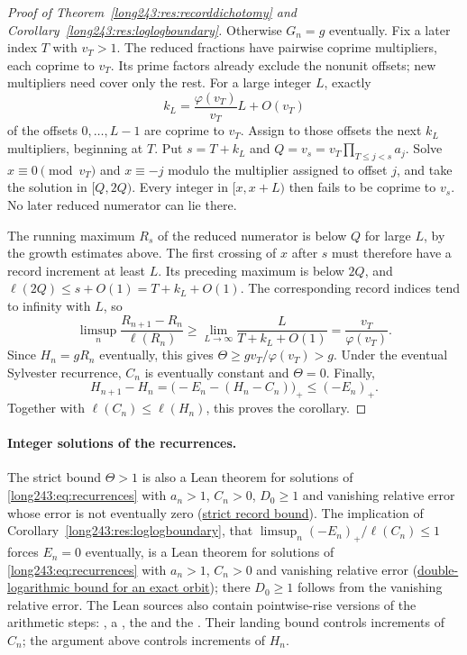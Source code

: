 \begin{proof}[Proof of Theorem~\ref{long243:res:recorddichotomy} and
Corollary~\ref{long243:res:loglogboundary}]
Otherwise $G_n=g$ eventually. Fix a later index $T$ with $v_T>1$.
The reduced fractions have pairwise coprime multipliers, each coprime
to $v_T$. Its prime factors already exclude the nonunit offsets;
new multipliers need cover only the rest. For a large integer $L$, exactly
\[
 k_L=\frac{\varphi(v_T)}{v_T}L+O(v_T)
\]
of the offsets $0,\ldots,L-1$ are coprime to $v_T$.
Assign to those offsets the next $k_L$ multipliers, beginning at $T$.
Put $s=T+k_L$ and $Q=v_s=v_T\prod_{T\le j<s}a_j$.
Solve $x\equiv0\pmod{v_T}$ and $x\equiv-j$ modulo the multiplier
assigned to offset $j$, and take the solution in $[Q,2Q)$.
Every integer in $[x,x+L)$ then fails to be coprime to $v_s$.
No later reduced numerator can lie there.

The running maximum $R_s$ of the reduced numerator is below $Q$ for
large $L$, by the growth estimates above. The first crossing of $x$
after $s$ must therefore have a record increment at least $L$.
Its preceding maximum is below $2Q$, and
$\ell(2Q)\le s+O(1)=T+k_L+O(1)$. The corresponding record indices tend
to infinity with $L$, so
\[
 \limsup_n\frac{R_{n+1}-R_n}{\ell(R_n)}
 \ge\lim_{L\to\infty}\frac{L}{T+k_L+O(1)}
 =\frac{v_T}{\varphi(v_T)}.
\]
Since $H_n=gR_n$ eventually, this gives
$\Theta\ge g v_T/\varphi(v_T)>g$.
Under the eventual Sylvester recurrence, $C_n$ is eventually constant and $\Theta=0$.
Finally,
\[
 H_{n+1}-H_n=\bigl(-E_n-(H_n-C_n)\bigr)_+\le(-E_n)_+.
\]
Together with $\ell(C_n)\le\ell(H_n)$, this proves the corollary.
\end{proof}

\paragraph{Integer solutions of the recurrences.}
The strict bound $\Theta>1$ is also a Lean theorem for solutions of
\eqref{long243:eq:recurrences} with $a_n>1$, $C_n>0$, $D_0\ge1$ and vanishing relative error whose error
is not eventually zero
(\href{\laterepobase/lean/ErdosProblems/Erdos243/PaperCompleteR21/ExactOrbitRecordDichotomy.lean\#L363}{strict record bound}).
The implication of Corollary~\ref{long243:res:loglogboundary}, that
$\limsup_n(-E_n)_+/\ell(C_n)\le1$ forces $E_n=0$ eventually, is a Lean
theorem for solutions of \eqref{long243:eq:recurrences} with $a_n>1$,
$C_n>0$ and vanishing relative error
(\href{\laterepobase/lean/ErdosProblems/Erdos243/PaperCompleteR21/DoubleLogOrbitBound.lean\#L45}{double-logarithmic bound for an exact orbit});
there $D_0\ge1$ follows from the vanishing relative error.
The Lean sources also contain pointwise-rise versions of the arithmetic
steps:
, a
\lword{Erdos243/SlowRiseBarrier.lean}{51}{exists_consecutiveMultiples_between}{CRT
block starting in $[P,2P)$}, the
 and the
. Their landing bound controls increments of $C_n$; the
argument above controls increments of $H_n$.

